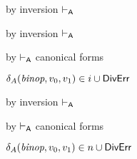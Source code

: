 {\begin{lamportproof*}
    \begin{pfproof}
        \begin{pfproof}
          by inversion $\vdash_{\mathsf{A}}$
        \end{pfproof}
        \begin{pfproof}
            \begin{pfproof}
              by inversion $\vdash_{\mathsf{A}}$
            \end{pfproof}
            \begin{pfproof}
              by $\vdash_{\mathsf{A}}$ canonical forms
            \end{pfproof}
          \qedstep
            \begin{pfproof}
              $\delta_{A}(\textit{binop}, v_0, v_1) \in i \cup \mathsf{DivErr}$
            \end{pfproof}
        \end{pfproof}
        \begin{pfproof}
            \begin{pfproof}
              by inversion $\vdash_{\mathsf{A}}$
            \end{pfproof}
            \begin{pfproof}
              by $\vdash_{\mathsf{A}}$ canonical forms
            \end{pfproof}
          \qedstep
            \begin{pfproof}
              $\delta_{A}(\textit{binop}, v_0, v_1) \in n \cup \mathsf{DivErr}$
            \end{pfproof}
        \end{pfproof}
    \end{pfproof}


\end{lamportproof*}}
